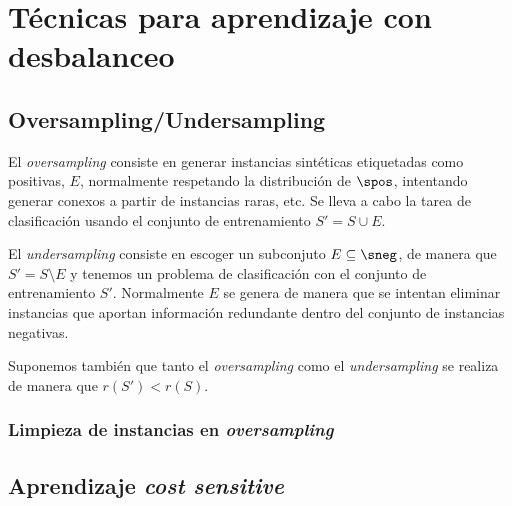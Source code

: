 \section{Técnicas para aprendizaje con desbalanceo}
\subsection{Oversampling/Undersampling}
El \textit{oversampling} consiste en generar instancias sintéticas etiquetadas como positivas, $E$, normalmente 
respetando la distribución de $\spos$, intentando generar conexos a partir de instancias raras, etc. Se lleva a cabo la 
tarea de clasificación usando el conjunto de entrenamiento $S' = S\cup E$. 

El \textit{undersampling} consiste en escoger un subconjuto $E \subseteq \sneg$, de manera que $S' = S\setminus E$ 
y tenemos un problema de clasificación con el conjunto de entrenamiento $S'$. Normalmente $E$ se genera de manera que se
intentan eliminar instancias que aportan información redundante dentro del conjunto de instancias negativas.

Suponemos también que tanto el \textit{oversampling} como el \textit{undersampling} se realiza de manera que $r(S') < r(S)$.

\subsubsection{Limpieza de instancias en \textit{oversampling}}

\subsection{Aprendizaje \textit{cost sensitive}}
